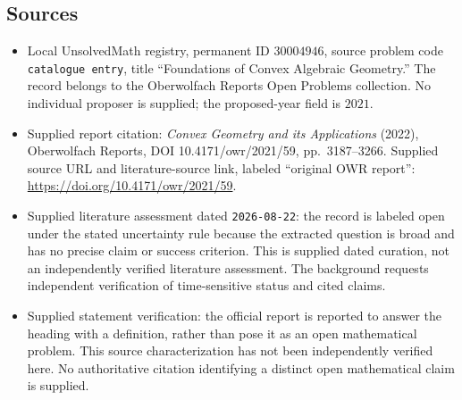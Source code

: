 \documentclass[11pt]{article}
\begin{document}
\subsection{Sources}
\begin{itemize}
\item Local UnsolvedMath registry, permanent ID \(30004946\), source problem code \texttt{catalogue entry}, title ``Foundations of Convex Algebraic Geometry.'' The record belongs to the Oberwolfach Reports Open Problems collection. No individual proposer is supplied; the proposed-year field is \(2021\).
\item Supplied report citation: \emph{Convex Geometry and its Applications} (2022), Oberwolfach Reports, DOI 10.4171/owr/2021/59, pp.~3187--3266. Supplied source URL and literature-source link, labeled ``original OWR report'': \url{https://doi.org/10.4171/owr/2021/59}.
\item Supplied literature assessment dated \texttt{2026-08-22}: the record is labeled open under the stated uncertainty rule because the extracted question is broad and has no precise claim or success criterion. This is supplied dated curation, not an independently verified literature assessment. The background requests independent verification of time-sensitive status and cited claims.
\item Supplied statement verification: the official report is reported to answer the heading with a definition, rather than pose it as an open mathematical problem. This source characterization has not been independently verified here. No authoritative citation identifying a distinct open mathematical claim is supplied.
\end{itemize}
\end{document}
